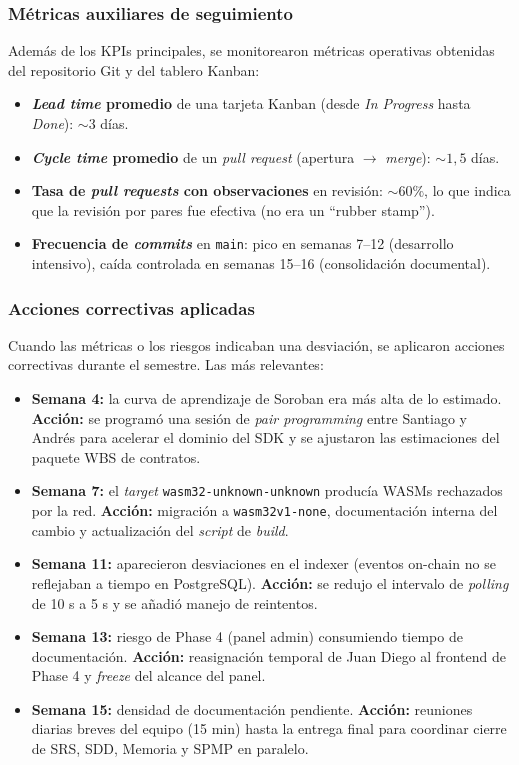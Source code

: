 \documentclass[12pt,oneside]{report}
\begin{document}
      \subsubsection{Métricas auxiliares de seguimiento}
      Además de los KPIs principales, se monitorearon métricas operativas obtenidas del repositorio Git y del tablero Kanban:
      \begin{itemize}
        \item \textbf{\textit{Lead time} promedio} de una tarjeta Kanban (desde \textit{In Progress} hasta \textit{Done}): $\sim 3$ días.
        \item \textbf{\textit{Cycle time} promedio} de un \textit{pull request} (apertura $\rightarrow$ \textit{merge}): $\sim 1{,}5$ días.
        \item \textbf{Tasa de \textit{pull requests} con observaciones} en revisión: $\sim 60\%$, lo que indica que la revisión por pares fue efectiva (no era un ``rubber stamp'').
        \item \textbf{Frecuencia de \textit{commits}} en \texttt{main}: pico en semanas 7--12 (desarrollo intensivo), caída controlada en semanas 15--16 (consolidación documental).
      \end{itemize}

      \subsubsection{Acciones correctivas aplicadas}
      Cuando las métricas o los riesgos indicaban una desviación, se aplicaron acciones correctivas durante el semestre. Las más relevantes:
      \begin{itemize}
        \item \textbf{Semana 4:} la curva de aprendizaje de Soroban era más alta de lo estimado. \textbf{Acción:} se programó una sesión de \textit{pair programming} entre Santiago y Andrés para acelerar el dominio del SDK y se ajustaron las estimaciones del paquete WBS de contratos.
        \item \textbf{Semana 7:} el \textit{target} \texttt{wasm32-unknown-unknown} producía WASMs rechazados por la red. \textbf{Acción:} migración a \texttt{wasm32v1-none}, documentación interna del cambio y actualización del \textit{script} de \textit{build}.
        \item \textbf{Semana 11:} aparecieron desviaciones en el indexer (eventos on-chain no se reflejaban a tiempo en PostgreSQL). \textbf{Acción:} se redujo el intervalo de \textit{polling} de 10 s a 5 s y se añadió manejo de reintentos.
        \item \textbf{Semana 13:} riesgo de Phase 4 (panel admin) consumiendo tiempo de documentación. \textbf{Acción:} reasignación temporal de Juan Diego al frontend de Phase 4 y \textit{freeze} del alcance del panel.
        \item \textbf{Semana 15:} densidad de documentación pendiente. \textbf{Acción:} reuniones diarias breves del equipo (15 min) hasta la entrega final para coordinar cierre de SRS, SDD, Memoria y SPMP en paralelo.
      \end{itemize}
\end{document}
